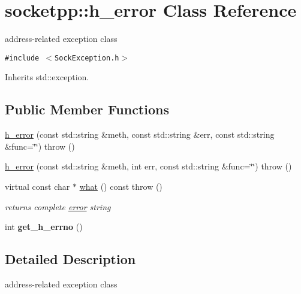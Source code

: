 \hypertarget{classsocketpp_1_1h__error}{
\section{socketpp::h\_\-error Class Reference}
\label{classsocketpp_1_1h__error}
}
address-related exception class  


{\tt \#include $<$SockException.h$>$}

Inherits std::exception.

\subsection*{Public Member Functions}
\begin{CompactItemize}
\item 
\hyperlink{classsocketpp_1_1h__error_c15a1c6216114250241349fdfcdeb98a}{h\_\-error} (const std::string \&meth, const std::string \&err, const std::string \&func=\char`\"{}\char`\"{})  throw ()
\item 
\hyperlink{classsocketpp_1_1h__error_67e7b6bcd23ebdd79a5fdcf1f01070fe}{h\_\-error} (const std::string \&meth, int err, const std::string \&func=\char`\"{}\char`\"{})  throw ()
\item 
\hypertarget{classsocketpp_1_1h__error_055c1a5b55b5d02fe81fd74cb8b900d2}{
virtual const char $\ast$ \hyperlink{classsocketpp_1_1h__error_055c1a5b55b5d02fe81fd74cb8b900d2}{what} () const   throw ()}
\label{classsocketpp_1_1h__error_055c1a5b55b5d02fe81fd74cb8b900d2}

\begin{CompactList}\small\item\em returns complete \hyperlink{classsocketpp_1_1error}{error} string \item\end{CompactList}\item 
\hypertarget{classsocketpp_1_1h__error_b2aabd50ea2f3189b09bc749a875e38f}{
int \textbf{get\_\-h\_\-errno} ()}
\label{classsocketpp_1_1h__error_b2aabd50ea2f3189b09bc749a875e38f}

\end{CompactItemize}


\subsection{Detailed Description}
address-related exception class 

